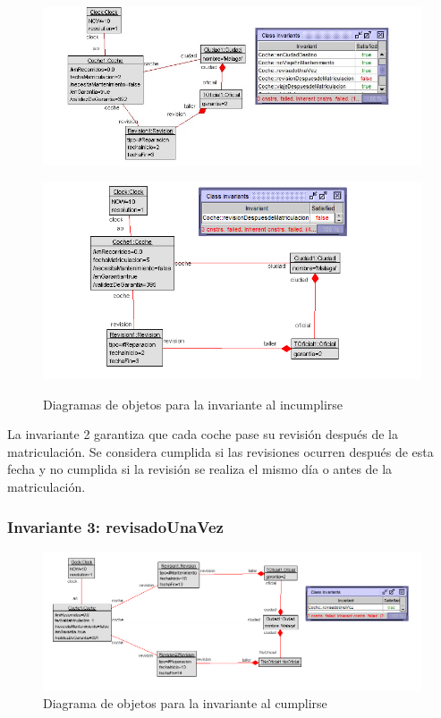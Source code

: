 \documentclass[12pt.a4paper]{article}
\begin{document}
\begin{figure}[H]
    \centering
    \begin{minipage}{0.49\textwidth}
        \centering
        \includegraphics[width=1\linewidth]{Soils/2.jpg}
        \label{fig:diagrama1}
    \end{minipage}
    \hfill
    \begin{minipage}{0.49\textwidth}
        \centering
        \includegraphics[width=1\linewidth]{Soils/2_v3.png}
        \label{fig:diagrama2}
    \end{minipage}
    \caption{Diagramas de objetos para la invariante al incumplirse}
    \label{fig:diagrama_invariante}
\end{figure}


La invariante 2 garantiza que cada coche pase su revisión después de la matriculación. Se considera cumplida si las revisiones ocurren después de esta fecha y no cumplida si la revisión se realiza el mismo día o antes de la matriculación.

\subsubsection{Invariante 3: revisadoUnaVez}
    \begin{figure}[H]
         \centering
         \includegraphics[width=1\linewidth]{Soils/3.png}
         \caption{Diagrama de objetos para la invariante al cumplirse}
         \label{Diagrama_cumplimiento}
    \end{figure}
\end{document}
